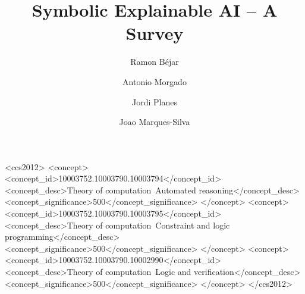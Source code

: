 \title[Symbolic Explainable AI]%
      {Symbolic Explainable AI -- A Survey}


\author{Ramon B\'{e}jar}
\orcid{}


\author{Antonio Morgado}
\orcid{}


\author{Jordi Planes}
\orcid{}


\author{Joao Marques-Silva}


\renewcommand{\shortauthors}{Bejar, Morgado, Planes, Marques-Silva}



\begin{CCSXML}
<ccs2012>
<concept>
<concept_id>10003752.10003790.10003794</concept_id>
<concept_desc>Theory of computation~Automated reasoning</concept_desc>
<concept_significance>500</concept_significance>
</concept>
<concept>
<concept_id>10003752.10003790.10003795</concept_id>
<concept_desc>Theory of computation~Constraint and logic programming</concept_desc>
<concept_significance>500</concept_significance>
</concept>
<concept>
<concept_id>10003752.10003790.10002990</concept_id>
<concept_desc>Theory of computation~Logic and verification</concept_desc>
<concept_significance>500</concept_significance>
</concept>
</ccs2012>
\end{CCSXML}

